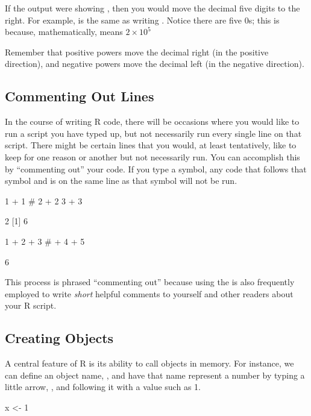 If the output were showing , then you would move the decimal five digits to the right. For example,  is the same as writing . Notice there are five 0s; this is because, mathematically,  means $2 \times 10^5$

Remember that positive powers move the decimal right (in the positive direction), and negative powers move the decimal left (in the negative direction).


\subsection{Commenting Out Lines}
In the course of writing R code, there will be occasions where you would like to run a script you have typed up, but not necessarily run every single line on that script.  There might be certain lines that you would, at least tentatively, like to keep for one reason or another but not necessarily run.  You can accomplish this by ``commenting out'' your code.  If you type a \R{\#} symbol, any code that follows that symbol and is on the same line as that symbol will not be run.

\begin{inR}
1 + 1
# 2 + 2
3 + 3
\end{inR}
\begin{outR}
[1] 2
[1] 6
\end{outR}

\begin{inR}
1 + 2 + 3 # + 4 + 5
\end{inR}
\begin{outR}
[1] 6
\end{outR}

\noindent
This process is phrased ``commenting out'' because using the \R{\#} is also frequently employed to write \textit{short} helpful comments to yourself and other readers about your R script.


\subsection{Creating Objects}

A central feature of R is its ability to call objects in memory. For instance, we can define an object name, , and have that name represent a number by typing a little arrow, \R{<-}, and following it with a value such as 1.

\begin{inR}
x <- 1
\end{inR}

